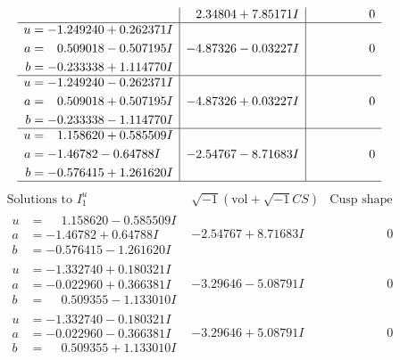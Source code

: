\documentclass[1p]{elsarticle_modified}
\theoremstyle{definition}
\newcommand{\I}{\sqrt{-1}}
\begin{document}
$$\begin{array}{c|c|c}
 & \phantom{-}2.34804 + 7.85171 I & \phantom{-0.000000 } 0 \\ \hline\begin{aligned}
u &= -1.249240 + 0.262371 I \\
a &= \phantom{-}0.509018 - 0.507195 I \\
b &= -0.233338 + 1.114770 I\end{aligned}
 & -4.87326 - 0.03227 I & \phantom{-0.000000 } 0 \\ \hline\begin{aligned}
u &= -1.249240 - 0.262371 I \\
a &= \phantom{-}0.509018 + 0.507195 I \\
b &= -0.233338 - 1.114770 I\end{aligned}
 & -4.87326 + 0.03227 I & \phantom{-0.000000 } 0 \\ \hline\begin{aligned}
u &= \phantom{-}1.158620 + 0.585509 I \\
a &= -1.46782 - 0.64788 I \\
b &= -0.576415 + 1.261620 I\end{aligned}
 & -2.54767 - 8.71683 I & \phantom{-0.000000 } 0\\
 \hline 
 \end{array}$$\newpage$$\begin{array}{c|c|c}  
\text{Solutions to }I^u_{1}& \I (\text{vol} + \sqrt{-1}CS) & \text{Cusp shape}\\
 \hline 
\begin{aligned}
u &= \phantom{-}1.158620 - 0.585509 I \\
a &= -1.46782 + 0.64788 I \\
b &= -0.576415 - 1.261620 I\end{aligned}
 & -2.54767 + 8.71683 I & \phantom{-0.000000 } 0 \\ \hline\begin{aligned}
u &= -1.332740 + 0.180321 I \\
a &= -0.022960 + 0.366381 I \\
b &= \phantom{-}0.509355 - 1.133010 I\end{aligned}
 & -3.29646 - 5.08791 I & \phantom{-0.000000 } 0 \\ \hline\begin{aligned}
u &= -1.332740 - 0.180321 I \\
a &= -0.022960 - 0.366381 I \\
b &= \phantom{-}0.509355 + 1.133010 I\end{aligned}
 & -3.29646 + 5.08791 I & \phantom{-0.000000 } 0 \\ \hline\begin{aligned}

\end{aligned}
\end{array}$$
\end{document}
